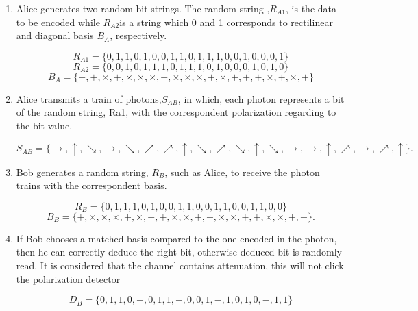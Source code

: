 \begin{enumerate}
	\item Alice generates two random bit strings. The random string ,$R_{A1}$, is the data to be encoded while $R_{A2} $is a string which 0 and 1 corresponds to rectilinear and diagonal basis $B_{A}$, respectively.
	
	$$ R_{A1} = \{0,1,1,0,1,0,0,1,1,0,1,1,1,0,0,1,0,0,0,1\}$$
	$$ R_{A2} = \{0,0,1,0,1,1,1,0,1,1,1,0,1,0,0,0,1,0,1,0\}$$
	$$ B_{A} = \{+,+,\times,+,\times, \times, \times, +,\times, \times, \times,+,\times,+,+,+,\times,+,\times,+\}$$
	
	\item Alice transmits a train of photons,$S_{AB}$, in which, each photon represents a bit of the random string, Ra1, with the correspondent polarization regarding to the bit value.
	
	$$S_{AB} = \{\to, \uparrow, \searrow, \to, \searrow, \nearrow, \nearrow, \uparrow, \searrow, \nearrow, \searrow, \uparrow, \searrow, \to, \to, \uparrow, \nearrow, \to, \nearrow, \uparrow\}.$$
	
	\item Bob generates a random string, $R_{B}$, such as Alice, to receive the photon trains with the correspondent basis.
	
	$$ R_{B} = \{0,1,1,1,0,1,0,0,1,1,0,0,1,1,0,0,1,1,0,0\}$$
	$$B_{B} = \{ +,\times,\times,\times,+,\times,+,+,\times,\times,+,+,\times,\times,+,+,\times,\times,+,+\}.$$
	
	\item If Bob chooses a matched basis compared to the one encoded in the photon, then he can correctly deduce the right bit, otherwise deduced bit is randomly read. It is considered that the channel contains attenuation, this will not click the polarization detector
	
	$$D_{B} = \{0,1,1,0,-,0,1,1,-,0,0,1,-,1,0,1,0,-,1,1\}$$
	
\end{enumerate}

